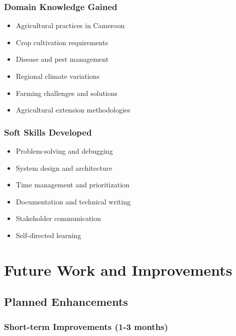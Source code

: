 \documentclass[12pt,a4paper]{article}
\begin{document}
\subsubsection{Domain Knowledge Gained}

\begin{itemize}[leftmargin=*]
    \item Agricultural practices in Cameroon
    \item Crop cultivation requirements
    \item Disease and pest management
    \item Regional climate variations
    \item Farming challenges and solutions
    \item Agricultural extension methodologies
\end{itemize}

\subsubsection{Soft Skills Developed}

\begin{itemize}[leftmargin=*]
    \item Problem-solving and debugging
    \item System design and architecture
    \item Time management and prioritization
    \item Documentation and technical writing
    \item Stakeholder communication
    \item Self-directed learning
\end{itemize}

\section{Future Work and Improvements}

\subsection{Planned Enhancements}

\subsubsection{Short-term Improvements (1-3 months)}
\end{document}
